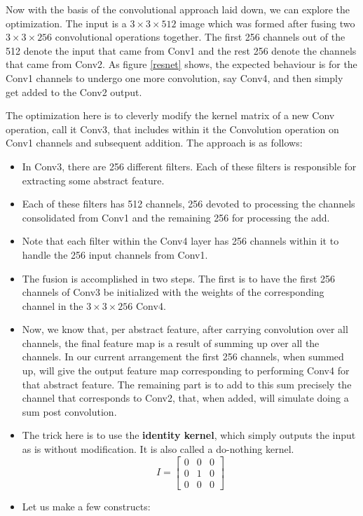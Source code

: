 \documentclass[12pt,a4paper,twoside,openright,bibliography=totocnumbered]{report}
\begin{document}
	Now with the basis of the convolutional approach laid down, we can explore the optimization. The input is a $3 \times 3 \times 512$ image which was formed after fusing two $3 \times 3 \times 256$ convolutional operations together. The first 256 channels out of the 512 denote the input that came from Conv1 and the rest 256 denote the channels that came from Conv2. As figure \ref{resnet} shows, the expected behaviour is for the Conv1 channels to undergo one more convolution, say Conv4, and then simply get added to the Conv2 output.

	The optimization here is to cleverly modify the kernel matrix of a new Conv operation, call it Conv3, that includes within it the Convolution operation on Conv1 channels and subsequent addition. The approach is as follows:
	  \begin{itemize}
		\item In Conv3, there are 256 different filters. Each of these filters is responsible for extracting some abstract feature.
		\item Each of these filters has 512 channels, 256 devoted to processing the channels consolidated from Conv1 and the remaining 256 for processing the add.
		\item Note that each filter within the Conv4 layer has 256 channels within it to handle the 256 input channels from Conv1.
		\item The fusion is accomplished in two steps. The first is to have the first 256 channels of Conv3 be initialized with the weights of the corresponding channel in the $3 \times 3 \times 256$ Conv4.
		\item Now, we know that, per abstract feature, after carrying convolution over all channels, the final feature map is a result of summing up over all the channels. In our current arrangement the first 256 channels, when summed up, will give the output feature map corresponding to performing Conv4 for that abstract feature. The remaining part is to add to this sum precisely the channel that corresponds to Conv2, that, when added, will simulate doing a sum post convolution.
		\item The trick here is to use the \textbf{identity kernel}, which simply outputs the input as is without modification. It is also called a do-nothing kernel.
		\[ I = 
	\begin{bmatrix}
	0 & 0 & 0 \\
	0 & 1 & 0 \\
	0 & 0 & 0
	\end{bmatrix}
	\]
		\item Let us make a few constructs:

\end{itemize}
\end{document}
